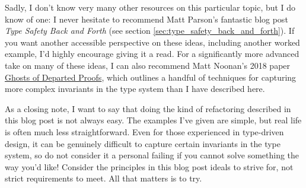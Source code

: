 Sadly, I don't know very many other resources on this particular topic, but I do know of one: I never hesitate to recommend Matt Parson's fantastic blog post \textit{Type Safety Back and Forth} (see section \ref{sec:type_safety_back_and_forth}). If you want another accessible perspective on these ideas, including another worked example, I'd highly encourage giving it a read. For a significantly more advanced take on many of these ideas, I can also recommend Matt Noonan's 2018 paper \href{https://kataskeue.com/gdp.pdf}{Ghosts of Departed Proofs}, which outlines a handful of techniques for capturing more complex invariants in the type system than I have described here.

As a closing note, I want to say that doing the kind of refactoring described in this blog post is not always easy. The examples I've given are simple, but real life is often much less straightforward. Even for those experienced in type-driven design, it can be genuinely difficult to capture certain invariants in the type system, so do not consider it a personal failing if you cannot solve something the way you'd like! Consider the principles in this blog post ideals to strive for, not strict requirements to meet. All that matters is to try.

